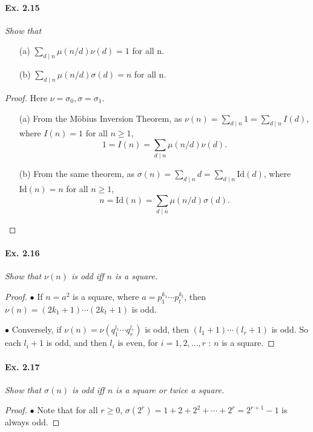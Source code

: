 \documentclass[11pt,a4paper]{article}
\begin{document}
{\paragraph{Ex. 2.15}

{\it 
Show that
\begin{enumerate}
  \item[(a)] $\sum_{d\mid n} \mu(n/d)\nu(d) = 1$ for all n.
  \item[(b)] $\sum_{d\mid n} \mu(n/d) \sigma(d) = n$ for all n.
\end{enumerate}
}

\begin{proof}
Here $\nu = \sigma_0, \sigma = \sigma_1$.
\begin{enumerate}
\item[(a)] From the M\"{o}bius Inversion Theorem, as $\nu(n) = \sum_{d\mid n }1 =\sum_{d\mid n } I(d)$, where $I(n) = 1$ for all $n\geq 1$,
$$1 = I(n) =  \sum_{d\mid n} \mu(n/d) \nu(d).$$
\item[(b)]  From the same theorem, as $\sigma(n) = \sum_{d\mid n }d = \sum_{d\mid n } \mathrm{Id}(d)$, where  $\mathrm{Id}(n) = n$ for all $n\geq 1$,
$$ n= \mathrm{Id}(n) =  \sum_{d\mid n} \mu(n/d) \sigma(d).$$ 
\end{enumerate}
\end{proof}

\paragraph{Ex. 2.16}

{\it Show that $\nu(n)$ is odd iff $n$ is a square.
}

\begin{proof}
$\bullet$ If $n=a^2$ is a square, where $a = p_1^{k_1}\cdots p_t^{k_t}$, then $\nu(n) = (2k_1+1)\cdots(2k_t+1)$ is odd.

$\bullet$ Conversely, if $\nu(n) = \nu(q_1^{l_1}\cdots q_r^{l_r})$ is odd, then $(l_1 +1)\cdots(l_r+1)$ is odd. So each $l_i+1$ is odd, and then $l_i$ is even, for $i=1,2,\ldots,r$ : $n$ is a square.
\end{proof}

\paragraph{Ex. 2.17}

{\it Show that $\sigma(n)$ is odd iff $n$ is a square or twice a square.
}

\begin{proof}
$\bullet$ Note that for all $r\geq 0$, $\sigma(2^r) = 1+2+2^2+\cdots+2^r = 2^{r+1} - 1$ is always odd.


\end{proof}}
\end{document}

